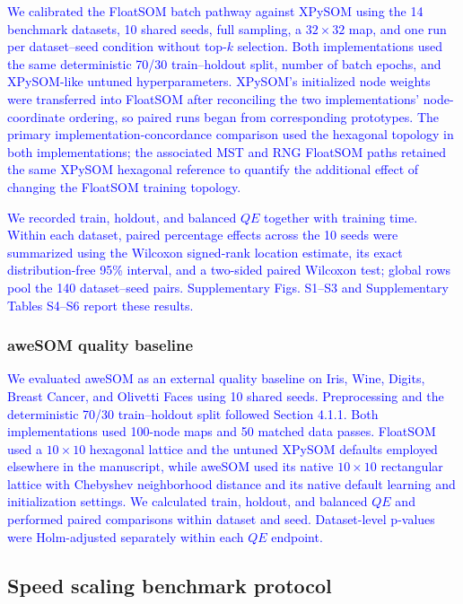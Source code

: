 \documentclass[10pt]{article} %
\newcommand{\TrackedChange}[1]{\textcolor{blue}{#1}}
\begin{document}
\TrackedChange{We calibrated the FloatSOM batch pathway against XPySOM using the 14 benchmark datasets, 10 shared seeds, full sampling, a $32\times32$ map, and one run per dataset--seed condition without top-$k$ selection.} \TrackedChange{Both implementations used the same deterministic 70/30 train--holdout split, number of batch epochs, and XPySOM-like untuned hyperparameters.} \TrackedChange{XPySOM's initialized node weights were transferred into FloatSOM after reconciling the two implementations' node-coordinate ordering, so paired runs began from corresponding prototypes.} \TrackedChange{The primary implementation-concordance comparison used the hexagonal topology in both implementations; the associated MST and RNG FloatSOM paths retained the same XPySOM hexagonal reference to quantify the additional effect of changing the FloatSOM training topology.}

\TrackedChange{We recorded train, holdout, and balanced $QE$ together with training time.} \TrackedChange{Within each dataset, paired percentage effects across the 10 seeds were summarized using the Wilcoxon signed-rank location estimate, its exact distribution-free 95\% interval, and a two-sided paired Wilcoxon test; global rows pool the 140 dataset--seed pairs.} \TrackedChange{Supplementary Figs. S1--S3 and Supplementary Tables S4--S6 report these results.}

{\color{blue}\subsubsection{aweSOM quality baseline}}

\TrackedChange{We evaluated aweSOM as an external quality baseline on Iris, Wine, Digits, Breast Cancer, and Olivetti Faces using 10 shared seeds.} \TrackedChange{Preprocessing and the deterministic 70/30 train--holdout split followed Section 4.1.1.} \TrackedChange{Both implementations used 100-node maps and 50 matched data passes.} \TrackedChange{FloatSOM used a $10\times10$ hexagonal lattice and the untuned XPySOM defaults employed elsewhere in the manuscript, while aweSOM used its native $10\times10$ rectangular lattice with Chebyshev neighborhood distance and its native default learning and initialization settings.} \TrackedChange{We calculated train, holdout, and balanced $QE$ and performed paired comparisons within dataset and seed.} \TrackedChange{Dataset-level p-values were Holm-adjusted separately within each $QE$ endpoint.}

\subsection{Speed scaling benchmark protocol}
\end{document}
